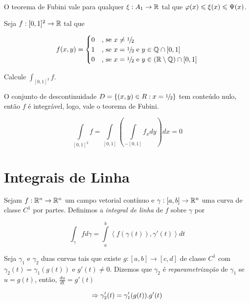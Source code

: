 \documentclass{book}
\begin{document}
\begin{cor}
  \begin{sloppypar}
   O teorema de Fubini vale para qualquer $\xi:A_1 \to \mathbb{R}$ tal que ${\varphi(x) \leqslant \xi(x) \leqslant \Psi(x)}$.
  \end{sloppypar}
\end{cor}

\begin{ex}
Seja $f:[0,1]^2 \to \mathbb{R}$ tal que

\begin{equation*}
  f(x,y) =
  \begin{cases}
    \hfill 0 	& \mbox{, se } x \ne \mfrac{1}{2} \\
    \hfill 1 	& \mbox{, se } x = \mfrac{1}{2} \mbox{ e } y \in \Q \cap [0,1] \\
    \hfill 0 	& \mbox{, se } x = \mfrac{1}{2} \mbox{ e } y \in (\R \setminus \Q) \cap [0,1]
  \end{cases}
\end{equation*}

Calcule $\int_{[0,1]^2} f$.
\end{ex}

\begin{sol}


O conjunto de descontinuidade $D = \{ (x,y) \in R: x = \mfrac{1}{2} \}$ tem conte\'udo nulo, ent\~ao $f$ \'e integr\'avel, logo, vale o teorema de Fubini.

\[
\int\limits_{[0,1]^2 } f  = \int\limits_{[0,1]} {\left( {\int\limits_{ - [0,1]} {f_x dy} } \right)} dx = 0
\]

\end{sol}


\section{Integrais de Linha} \label{sec29}
\begin{defn}
Sejam $f:\mathbb{R}^n \to \mathbb{R}^n$ um campo vetorial cont\'inuo e $\gamma :\left[ {a,b} \right] \to \mathbb{R}^n$ uma curva de classe $C^1$ por partes. Definimos a \textit{integral de linha} de $f$ sobre $\gamma$ por

\[
\int_\gamma  f d\gamma  = \int\limits_a^b {\left\langle {f\left( {\gamma \left( t \right)} \right),\gamma '\left( t \right)} \right\rangle dt}
\]
\end{defn}

\begin{defn}
Seja $\gamma_1$ e $\gamma_2$ duas curvas tais que existe $g:[a,b] \to [c,d]$ de classe $C^1$ com $\gamma_2 (t) = \gamma_1 (g(t))$ e $g'(t) \ne 0$. Dizemos que $\gamma_2$ \'e \textit{reparametriza\c c\~ao} de $\gamma_1$ se $u = g(t)$, ent\~ao, $\frac{du}{dt} = g'(t)$

\[
\Rightarrow \gamma_2 ' (t) = \gamma_1 ' (g(t)).g'(t)
\]
\end{defn}
\end{document}
